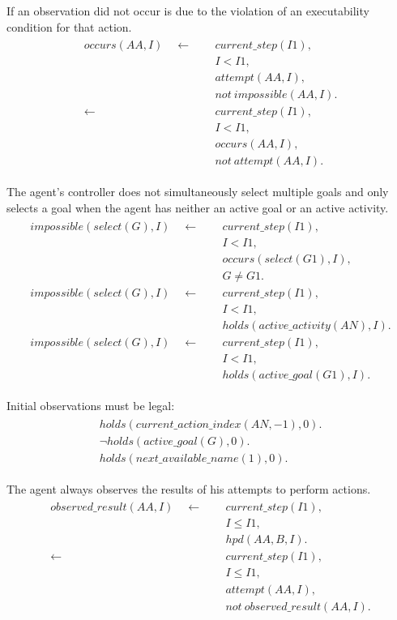 \documentclass[11pt, oneside]{article}
\begin{document}
If an observation did not occur is due to the violation of an executability condition for that action.
\begin{align}\begin{split}
occurs(AA, I)  \quad \leftarrow \quad\ &current\_step(I1),\\
&I<I1,\\
&attempt(AA,I),\\
&not\ impossible(AA,I).\\
\leftarrow \quad\ &current\_step(I1),\\
&I<I1,\\
&occurs(AA,I),\\
&not\ attempt(AA,I).
\end{split}\end{align}

The agent's controller does not simultaneously select multiple goals and only selects a goal when the agent has neither an active goal or an active activity.
\begin{align}\begin{split}
impossible(select(G),I) \quad \leftarrow \quad\ &current\_step (I1),\\
&I<I1,\\
&occurs(select(G1), I),\\
&G\neq G1.\\
impossible(select(G),I)  \quad \leftarrow \quad\ &current\_step (I1),\\
&I<I1,\\
&holds(active\_activity(AN), I).\\
impossible(select(G),I)  \quad \leftarrow \quad\ &current\_step (I1),\\
&I<I1,\\
&holds(active\_goal(G1), I).
\end{split}\end{align}

Initial observations must be legal:
\begin{align}\begin{split}
holds(current\_action\_index(AN, -1), 0).\\
\neg holds(active\_goal(G), 0).\\
holds(next\_available\_name(1), 0).
\end{split}\end{align}

The agent always observes the results of his attempts to perform actions.
\begin{align}\begin{split}
observed\_result(AA,I) \quad \leftarrow \quad\ &current\_step (I1),\\
&I\leq I1,\\
&hpd(AA,B,I).\\
\leftarrow \quad\ &current\_step (I1),\\
&I\leq I1,\\
&attempt(AA,I),\\
&not\ observed\_result(AA,I).
\end{split}\end{align}
\end{document}
